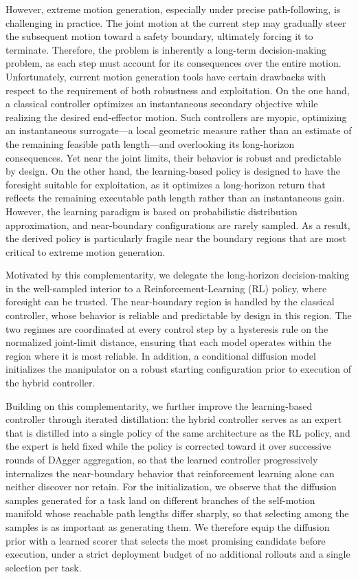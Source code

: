 \documentclass[journal, twoside]{IEEEtran}
\begin{document}
However, extreme motion generation, especially under precise path-following, is challenging in practice. The joint motion at the current step may gradually steer the subsequent motion toward a safety boundary, ultimately forcing it to terminate. Therefore, the problem is inherently a long-term decision-making problem, as each step must account for its consequences over the entire motion. Unfortunately, current motion generation tools have certain drawbacks with respect to the requirement of both robustness and exploitation. On the one hand, a classical controller optimizes an instantaneous secondary objective while realizing the desired end-effector motion. Such controllers are myopic, optimizing an instantaneous surrogate---a local geometric measure rather than an estimate of the remaining feasible path length---and overlooking its long-horizon consequences. Yet near the joint limits, their behavior is robust and predictable by design. On the other hand, the learning-based policy is designed to have the foresight suitable for exploitation, as it optimizes a long-horizon return that reflects the remaining executable path length rather than an instantaneous gain. However, the learning paradigm is based on probabilistic distribution approximation, and near-boundary configurations are rarely sampled. As a result, the derived policy is particularly fragile near the boundary regions that are most critical to extreme motion generation.

Motivated by this complementarity, we delegate the long-horizon decision-making in the well-sampled interior to a Reinforcement-Learning (RL) policy, where foresight can be trusted. The near-boundary region is handled by the classical controller, whose behavior is reliable and predictable by design in this region. The two regimes are coordinated at every control step by a hysteresis rule on the normalized joint-limit distance, ensuring that each model operates within the region where it is most reliable. In addition, a conditional diffusion model initializes the manipulator on a robust starting configuration prior to execution of the hybrid controller.

Building on this complementarity, we further improve the learning-based controller through iterated distillation: the hybrid controller serves as an expert that is distilled into a single policy of the same architecture as the RL policy, and the expert is held fixed while the policy is corrected toward it over successive rounds of DAgger aggregation, so that the learned controller progressively internalizes the near-boundary behavior that reinforcement learning alone can neither discover nor retain. For the initialization, we observe that the diffusion samples generated for a task land on different branches of the self-motion manifold whose reachable path lengths differ sharply, so that selecting among the samples is as important as generating them. We therefore equip the diffusion prior with a learned scorer that selects the most promising candidate before execution, under a strict deployment budget of no additional rollouts and a single selection per task.
\end{document}
